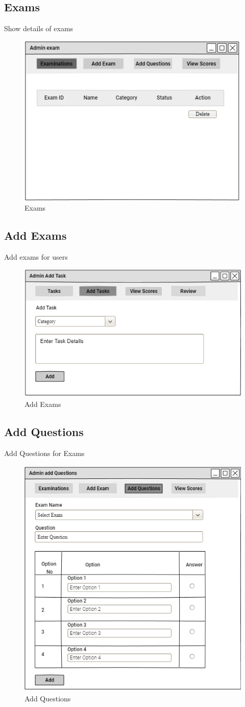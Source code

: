 \documentclass[a4paper,12pt]{report}
\begin{document}
\subsection {Exams}
Show details of exams
\begin{figure}[bph]
	\centering
	\includegraphics[width=.6\linewidth]{img/admin/adminexam}
	\caption{Exams}
\end{figure}
\pagebreak

\subsection {Add Exams}
Add exams for users
\begin{figure}[bph]
	\centering
	\includegraphics[width=.5\linewidth]{img/admin/adminaddtasks}
	\caption{Add Exams}
\end{figure}

\subsection {Add Questions}
Add Questions for Exams
\begin{figure}[bph]
	\centering
	\includegraphics[width=.5\linewidth]{img/admin/adminaddqstns}
	\caption{Add Questions}
\end{figure}
\pagebreak
\end{document}
